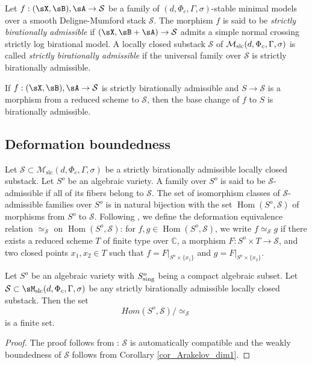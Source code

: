 \documentclass[11pt,letterpaper]{amsart}
\numberwithin{equation}{section}
\begin{document}
    \begin{defn}\label{defn_st_bir_admissible}
    	Let $f: (\sX, \sB), \sA \to \mathcal{S}$ be a family of $(d, \Phi_c, \Gamma, \sigma)$-stable minimal models over a smooth Deligne-Mumford stack $\mathcal{S}$.  
    	The morphism $f$ is said to be \emph{strictly birationally admissible} if $(\sX, \sB + \sA) \to \mathcal{S}$ admits a simple normal crossing strictly log birational model. A locally closed substack $\mathcal{S}$ of $\mathcal{M}_{\rm slc}(d, \Phi_c, \Gamma, \sigma)$ is called \emph{strictly birationally admissible} if the universal family over $\mathcal{S}$ is strictly birationally admissible.
    \end{defn}
    If $f: (\sX, \sB), \sA \to \mathcal{S}$ is strictly birationally admissible and $S \to \mathcal{S}$ is a morphism from a reduced scheme to $\mathcal{S}$, then the base change of $f$ to $S$ is birationally admissible.
    \subsection{Deformation boundedness}
	Let $\mathcal{S} \subset \mathcal{M}_{\mathrm{slc}}(d, \Phi_c, \Gamma, \sigma)$ be a strictly birationally admissible locally closed substack. Let $S^o$ be an algebraic variety. A family over $S^o$ is said to be $\mathcal{S}$-admissible if all of its fibers belong to $\mathcal{S}$. The set of isomorphism classes of $\mathcal{S}$-admissible families over $S^o$ is in natural bijection with the set $\operatorname{Hom}(S^o, \mathcal{S})$ of morphisms from $S^o$ to $\mathcal{S}$. Following \cite{Kovacs2011}, we define the deformation equivalence relation $\simeq_{\mathcal{S}}$ on $\operatorname{Hom}(S^o, \mathcal{S})$: for $f, g \in \operatorname{Hom}(S^o, \mathcal{S})$, we write $f \simeq_{\mathcal{S}} g$ if there exists a reduced scheme $T$ of finite type over $\mathbb{C}$, a morphism $F \colon S^o \times T \to \mathcal{S}$, and two closed points $x_1, x_2 \in T$ such that $f = F|_{S^o \times \{x_1\}}$ and $g = F|_{S^o \times \{x_2\}}$.
	\begin{thm}\label{thm_main_set_proof}
		Let $S^o$ be an algebraic variety with $S^o_{\rm sing}$ being a compact algebraic subset. Let $\mathcal{S}\subset \sM_{\rm slc}(d, \Phi_c, \Gamma, \sigma)$ be any strictly birationally admissible locally closed substack. Then the set
		$$Hom(S^o,\mathcal{S})/\simeq_{\mathcal{S}}$$
		is a finite set. 
	\end{thm}
    \begin{proof}
    	The proof follows from \cite[Theorem 1.7]{Kovacs2011}: $\mathcal{S}$ is automatically compatible and the weakly boundedness of $\mathcal{S}$ follows from Corollary \ref{cor_Arakelov_dim1}.
    \end{proof}
\end{document}
